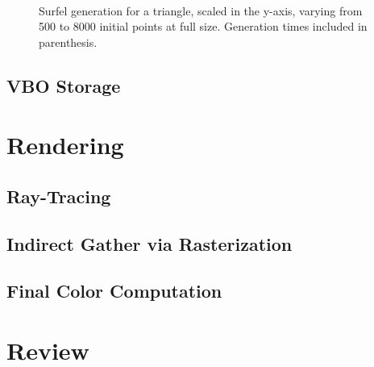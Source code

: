 \begin{figure}[h!]
   \\
   \captionfonts
   \caption[Triangle surfels at full size]{Surfel generation for a triangle, scaled in the y-axis, varying from 500 to 8000 initial points at full size. Generation times included in parenthesis.}
   \label{fig:triangle_surfels}
\end{figure}

\subsection{VBO Storage}
\label{sec:VBOStorage}

\section{Rendering}
\label{sec:rendering}

\subsection{Ray-Tracing}

\subsection{Indirect Gather via Rasterization}

\subsection{Final Color Computation}

\section{Review}

